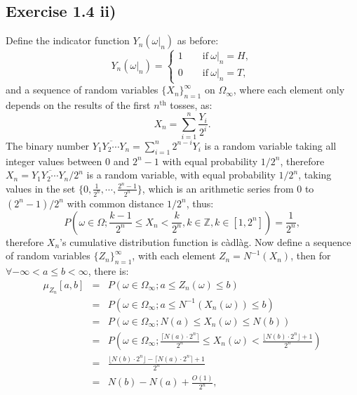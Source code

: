 \documentclass[final,3p,authoryear]{elsarticle}
\begin{document}
	\subsection{Exercise 1.4 ii)}
		Define the indicator function $Y_n(\omega|_n)$ as before:
		\begin{equation}
			Y_n(\omega|_n)=
			\begin{cases}
				1\qquad \mathrm{if~} \omega|_n=H,\\
				0\qquad \mathrm{if~} \omega|_n=T,
			\end{cases}
		\end{equation}
		and a sequence of random variables $\{X_n\}_{n=1}^{\infty}$ on $\Omega_\infty$, where each element only depends on the results of the first $n^\mathrm{th}$ tosses, as:
		\begin{equation}
			X_n=\sum\limits_{i=1}^{n} \frac{Y_i}{2^i}
			.
		\end{equation}
		The binary number $\overline{Y_1 Y_2 \cdots Y_n}=\sum\limits_{i=1}^{n} 2^{n-i} Y_i$ is a random variable taking all integer values between $0$ and $2^n-1$ with equal probability $1/2^n$, therefore $X_n= \overline{Y_1 Y_2 \cdots Y_n}/2^n$ is a random variable, with equal probability $1/2^n$, taking values in the set $\{0, \frac{1}{2^n}, \cdots, \frac{2^n-1}{2^n}\}$, which is an arithmetic series from $0$ to $(2^n-1)/2^n$ with common distance $1/2^n$, thus:
		\begin{equation}
			P(\omega \in \Omega; \frac{k-1}{2^n} \leq X_n < \frac{k}{2^n}, k \in \mathbb{Z},k \in [1,2^n]) = \frac{1}{2^n}
			,
		\end{equation}
		therefore $X_n$'s cumulative distribution function is c\`adl\`ag.
		Now define a sequence of random variables $\{Z_n\}_{n=1}^{\infty}$, with each element $Z_n = N^{-1}(X_n)$, then for $\forall -\infty < a \leq b < \infty$, there is:
		\begin{eqnarray}
			\mu_{Z_n}[a,b]&=&P(\omega \in \Omega_\infty; a \leq Z_n(\omega) \leq b)
			\nonumber\\
			&=&P(\omega \in \Omega_\infty; a \leq N^{-1}(X_n(\omega)) \leq b)
			\nonumber\\
			&=&P(\omega \in \Omega_\infty; N(a) \leq X_n(\omega) \leq N(b))
			\nonumber\\
			&=&P(\omega \in \Omega_\infty; \frac{\lceil N(a)\cdot 2^n \rceil}{2^n} \leq X_n(\omega) < \frac{\lfloor N(b)\cdot 2^n \rfloor + 1}{2^n})
			\nonumber\\
			&=& \frac{\lfloor N(b)\cdot 2^n \rfloor - \lceil N(a)\cdot 2^n \rceil + 1}{2^n}
			\nonumber\\
			&=&N(b)-N(a) + \frac{O(1)}{2^n}
			,
		\end{eqnarray}
\end{document}
